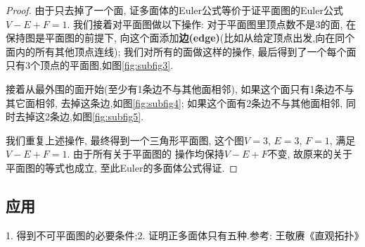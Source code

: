\documentclass[main]{subfiles}
\begin{document}
\begin{proof}
由于只去掉了一个面, 证多面体的Euler公式等价于证平面图的Euler公式\(V-E+F=1\).
我们接着对平面图做以下操作: 对于平面图里顶点数不是3的面, 在保持图是平面图的前提下, 
向这个面添加\textbf{边(edge)}(比如从给定顶点出发,向在同个面内的所有其他顶点连线); 我们对所有的面做这样的操作, 最后得到了一个每个面只有3个顶点的平面图,如图\ref{fig:subfig3}.

接着从最外围的面开始(至少有1条边不与其他面相邻), 如果这个面只有1条边不与其它面相邻, 去掉这条边,如图\ref{fig:subfig4}; 如果这个面有2条边不与其他面相邻, 同时去掉这2条边,如图\ref{fig:subfig5}.

我们重复上述操作, 最终得到一个三角形平面图, 这个图$V=3$, $E=3$, $F=1$, 满足$V-E+F=1$. 由于所有关于平面图的
操作均保持$V-E+F$不变, 故原来的关于平面图的等式也成立, 至此Euler的多面体公式得证.
\end{proof}

\subsection{应用}
1. 得到不可平面图的必要条件;2. 证明正多面体只有五种.\quad 参考: 王敬赓《直观拓扑》
\end{document}
